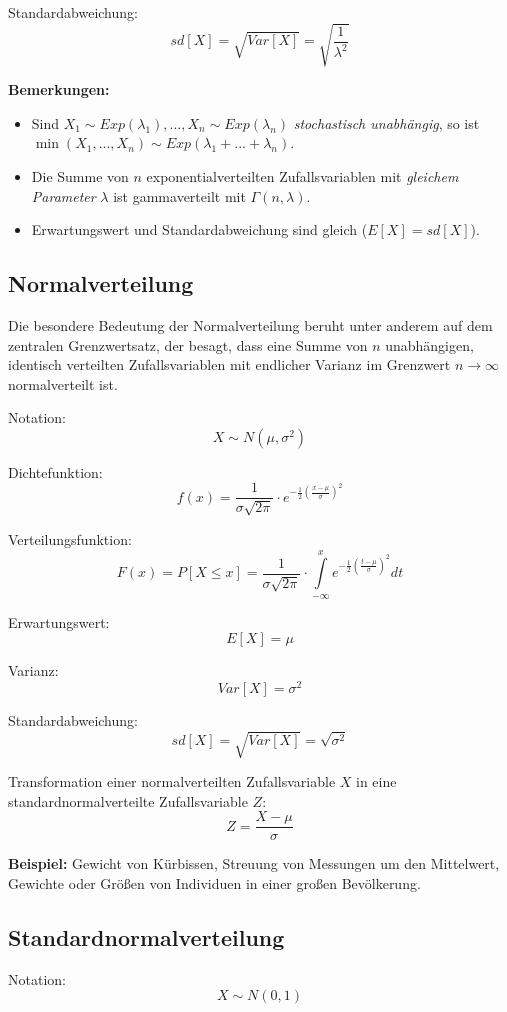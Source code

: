 \documentclass[10pt,a4paper,twocolumn]{article}
\begin{document}
Standardabweichung:
\[
sd[X]=\sqrt{Var[X]}=\sqrt{\frac{1}{\lambda^{2}}}
\]

\textbf{Bemerkungen:}
\begin{itemize}
\item Sind $X_1\sim Exp(\lambda_1), ..., X_n\sim Exp(\lambda_n)$ \emph{stochastisch unabhängig}, so ist $\min(X_1, ...,X_n)\sim Exp(\lambda_1+...+\lambda_n)$.
\item Die Summe von $n$ exponentialverteilten Zufallsvariablen mit \emph{gleichem Parameter} $\lambda$ ist gammaverteilt mit $\Gamma(n,\lambda)$.
\item Erwartungswert und Standardabweichung sind gleich ($E[X]=sd[X]$).
\end{itemize}

\subsection{Normalverteilung}
Die besondere Bedeutung der Normalverteilung beruht unter anderem auf dem zentralen Grenzwertsatz, der besagt, dass eine Summe von $n$ unabhängigen, identisch verteilten Zufallsvariablen mit endlicher Varianz im Grenzwert $n\rightarrow\infty$ normalverteilt ist.

\vspace{10pt}

Notation:
\[
X \sim N(\mu, \sigma^2)
\]

Dichtefunktion:
\[
f(x)=\frac{1}{\sigma \sqrt{2 \pi}}\cdot e^{-\frac{1}{2}\left(\frac{x-\mu}{\sigma}\right)^2}
\]

Verteilungsfunktion:
\[
F(x)=P[X \leq x]=\frac{1}{\sigma \sqrt{2 \pi}}\cdot\int\limits_{-\infty}^x e^{-\frac{1}{2}\left(\frac{t-\mu}{\sigma} \right)^2}dt
\]

Erwartungswert:
\[
E[X]=\mu
\]

Varianz:
\[
Var[X]=\sigma^2
\]

Standardabweichung:
\[
sd[X]=\sqrt{Var[X]}=\sqrt{\sigma^2}
\]

Transformation einer normalverteilten Zufallsvariable $X$ in eine standardnormalverteilte Zufallsvariable $Z$:
\[
Z=\frac{X-\mu}{\sigma}
\]

\textbf{Beispiel:} Gewicht von Kürbissen, Streuung von Messungen um den Mittelwert, Gewichte oder Größen von Individuen in einer großen Bevölkerung.

\subsection{Standardnormalverteilung}
Notation:
\[
X \sim N(0,1)
\]
\end{document}
